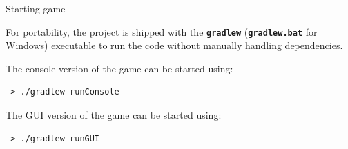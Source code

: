 \documentclass{beamer}
\begin{document}
  \begin{frame}[fragile]{Starting game}

    For portability, the project is shipped with the \texttt{\textbf{gradlew}} (\texttt{\textbf{gradlew.bat}} for Windows) executable to run the code without manually handling dependencies.

    \vspace{2em}

    The console version of the game can be started using:

    \begin{lstlisting}
 > ./gradlew runConsole
    \end{lstlisting}

    \vspace{1em}

    The GUI version of the game can be started using:

    \begin{lstlisting} 
 > ./gradlew runGUI
    \end{lstlisting}

  \end{frame}
\end{document}
